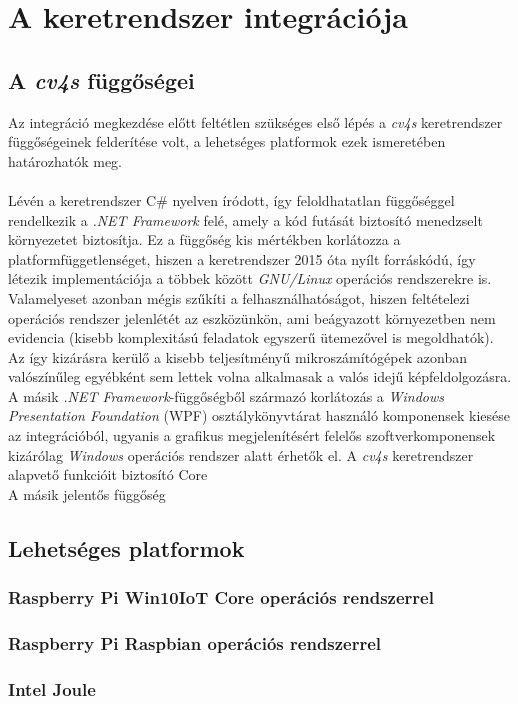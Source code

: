 \chapter{A keretrendszer integrációja}

\section{A \emph{cv4s} függőségei}

Az integráció megkezdése előtt feltétlen szükséges első lépés a \emph{cv4s} keretrendszer függőségeinek felderítése volt, a lehetséges platformok ezek ismeretében határozhatók meg. \\
\\
Lévén a keretrendszer C\# nyelven íródott, így feloldhatatlan függőséggel rendelkezik a \textit{.NET Framework} felé, amely a kód futását biztosító menedzselt környezetet biztosítja. Ez a függőség kis mértékben korlátozza a platformfüggetlenséget, hiszen a keretrendszer 2015 óta nyílt forráskódú, így létezik implementációja a többek között \emph{GNU/Linux} operációs rendszerekre is. Valamelyeset azonban mégis szűkíti a felhasználhatóságot, hiszen feltételezi operációs rendszer jelenlétét az eszközünkön, ami beágyazott környezetben nem evidencia (kisebb komplexitású feladatok egyszerű ütemezővel is megoldhatók). Az így kizárásra kerülő a kisebb teljesítményű mikroszámítógépek azonban valószínűleg egyébként sem lettek volna alkalmasak a valós idejű képfeldolgozásra. \\
A másik \emph{.NET Framework}-függőségből származó korlátozás a \textit{Windows Presentation Foundation} (WPF) osztálykönyvtárat használó komponensek kiesése az integrációból, ugyanis a grafikus megjelenítésért felelős szoftverkomponensek kizárólag \textit{Windows} operációs rendszer alatt érhetők el. A \emph{cv4s} keretrendszer alapvető funkcióit biztosító {\selectfont
Core
}
\\
A másik jelentős függőség 

\section{Lehetséges platformok}

\subsection{Raspberry Pi Win10IoT Core operációs rendszerrel}

\subsection{Raspberry Pi Raspbian operációs rendszerrel}

\subsection{Intel Joule}